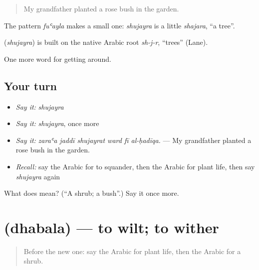 \begin{quote}
My grandfather planted a rose bush in the garden.
\end{quote}

The pattern \emph{fuʿayla} makes a small one: \emph{shujayra} is a little \emph{shajara}, \textquotedblleft{}a tree\textquotedblright{}.

\begin{cousinweb}
\textbf{} (\emph{shujayra}) is built on the native Arabic root \emph{sh-j-r}, \textquotedblleft{}trees\textquotedblright{} (Lane).
\end{cousinweb}

\begin{grammarlens}[title={What you've built}]
One more word for getting around.
\end{grammarlens}

\subsection*{Your turn}
\begin{itemize}
\raggedright
  \item \emph{Say it:} \emph{shujayra}
  \item \emph{Say it:} \emph{shujayra}, once more
  \item \emph{Say it:} \emph{zaraʿa jaddī shujayrat ward fī al-ḥadīqa.} — My grandfather planted a rose bush in the garden.
  \item \emph{Recall:} say the Arabic for to squander, then the Arabic for plant life, then say \emph{shujayra} again
\end{itemize}

\begin{tcolorbox}[breakable,colback=teal!4,colframe=teal!35!black,title={Before you move on}]
What does  mean? (\textquotedblleft{}A shrub; a bush\textquotedblright{}.) Say it once more.
\end{tcolorbox}
\section[\texorpdfstring{\ar{ذبل} (dhabala)}{ذبل (dhabala)}]{ (dhabala) — to wilt; to wither}

\label{lesson:AR-C468-dhabala}



\begin{quote}
Before the new one: say the Arabic for plant life, then the Arabic for a shrub.
\end{quote}

